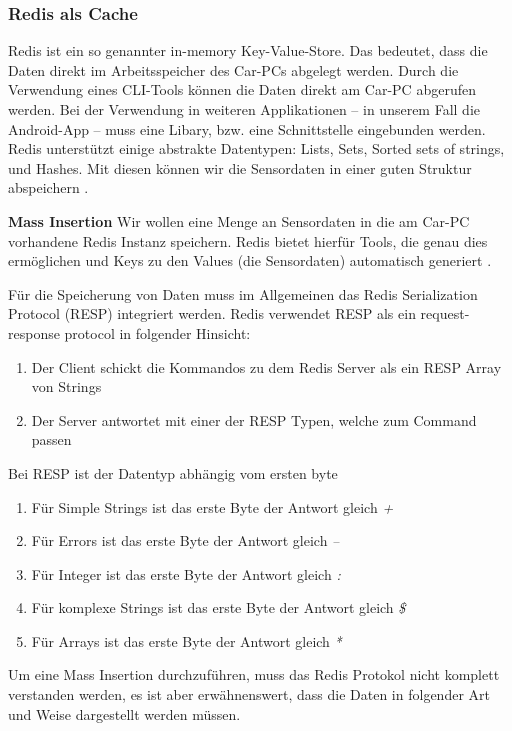 \subsubsection{Redis als Cache}
Redis ist ein so genannter in-memory Key-Value-Store. Das bedeutet, dass die Daten direkt im Arbeitsspeicher des Car-PCs abgelegt werden. Durch die Verwendung eines CLI-Tools können die Daten direkt am Car-PC abgerufen werden. Bei der Verwendung in weiteren Applikationen – in unserem Fall die Android-App – muss eine Libary, bzw. eine Schnittstelle eingebunden werden. Redis unterstützt einige abstrakte Datentypen: Lists, Sets, Sorted sets of strings, und Hashes. Mit diesen können wir die Sensordaten in einer guten Struktur abspeichern \cite{MELD.CH3-redis.mainWebsite}.

\textbf{Mass Insertion\newline}
Wir wollen eine Menge an Sensordaten in die am Car-PC vorhandene Redis Instanz speichern. Redis bietet hierfür Tools, die genau dies ermöglichen und Keys zu den Values (die Sensordaten) automatisch generiert \cite{MELD.CH3-redis.documentation}.

Für die Speicherung von Daten muss im Allgemeinen das Redis Serialization Protocol (RESP) integriert werden. Redis verwendet RESP als ein request-response protocol in folgender Hinsicht: 
\begin{enumerate}
\item Der Client schickt die Kommandos zu dem Redis Server als ein RESP Array von Strings
\item Der Server antwortet mit einer der RESP Typen, welche zum Command passen
\end{enumerate}

Bei RESP ist der Datentyp abhängig vom ersten byte
\begin{enumerate}
\item Für Simple Strings ist das erste Byte der Antwort gleich \textit{+}
\item Für Errors ist das erste Byte der Antwort gleich \textit{–}
\item Für Integer ist das erste Byte der Antwort gleich \textit{:}
\item Für komplexe Strings ist das erste Byte der Antwort gleich \textit{\$}
\item Für Arrays ist das erste Byte der Antwort gleich \textit{*}
\end{enumerate}

Um eine Mass Insertion durchzuführen, muss das Redis Protokol nicht komplett verstanden werden, es ist aber erwähnenswert, dass die Daten in folgender Art und Weise dargestellt werden müssen.

